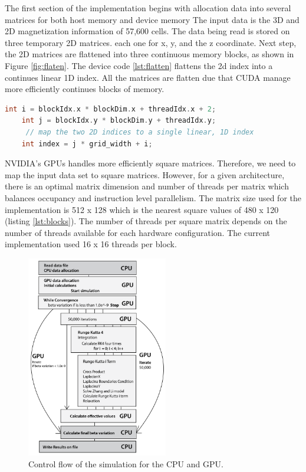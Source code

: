 The first section of the implementation begins with allocation data into several matrices for both host memory and device memory The input data is the 3D and 2D magnetization information of 57,600 cells. The data being read is stored on three temporary 2D matrices. each one for x, y, and the z coordinate. Next step, the 2D matrices are flattened into three continuous memory blocks, as shown in Figure \ref{fig:flaten}. The device code \ref{lst:flatten} flattens the 2d index into a continues linear 1D index. All the matrices are flatten due that CUDA manage more efficiently continues blocks of memory.

\begin{lstlisting}[language=C++, label={lst:flatten}, caption={Kernel flatten 2d - 1d}]	
    int i = blockIdx.x * blockDim.x + threadIdx.x + 2;
    int j = blockIdx.y * blockDim.y + threadIdx.y;
     // map the two 2D indices to a single linear, 1D index
    int index = j * grid_width + i; 
\end{lstlisting}


NVIDIA's GPUs handles more efficiently square matrices. Therefore, we need to map the input data set to square matrices. However, for a given architecture, there is an optimal matrix dimension and number of threads per matrix which balances occupancy and instruction level parallelism.  The matrix size used for the implementation is 512 x 128 which is the nearest square values of 480 x 120 (listing  \ref{lst:blocks}). The number of threads per square matrix depends on the number of threads available for each hardware configuration. The current implementation used 16 x 16 threads per block.
 
\begin{figure}[htbp]
	\centering
		\includegraphics[width=0.55\textwidth]{Figures/flow.png}
		\smallskip
	\caption[Control flow]{Control flow of the simulation for the CPU and GPU.}
	\label{fig:flow}
\end{figure}


